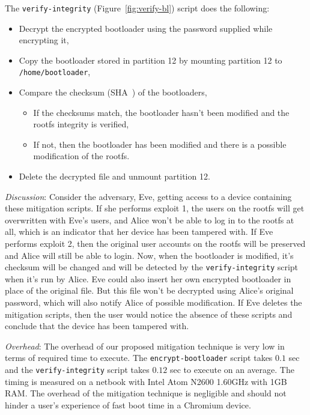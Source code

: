 \documentclass[11pt]{article}
\begin{document}
The \texttt{verify-integrity} (Figure~\ref{fig:verify-bl}) script does the following: 
\begin{itemize}
\item Decrypt the encrypted bootloader using the password supplied while
encrypting it,
\item Copy the bootloader stored in partition 12 by mounting partition 12
to \texttt{/home/bootloader},
\item Compare the checksum (SHA~\cite{sha1}) of the bootloaders,
\begin{itemize}
\item If the checksums match, the bootloader hasn't been modified and 
the rootfs integrity is verified,
\item If not, then the bootloader has been modified and there is a possible modification of the rootfs.
\end{itemize}

\item Delete the decrypted file and unmount partition 12.
\end{itemize}


\textit{Discussion}: Consider the adversary, Eve, getting access to a device containing these
mitigation scripts. If she performs exploit 1, the users on the rootfs will get
overwritten with Eve's users, and Alice won't be able to log in to the rootfs at all, which is an
indicator that her device has been tampered with. If Eve performs exploit 2, then the original user accounts on the rootfs will be preserved and Alice will still be able to login. Now, when the bootloader is modified, it's checksum will be changed and will be detected
by the \texttt{verify-integrity} script when it's run by Alice. Eve could also insert her own encrypted bootloader in
place of the original file. But this file won't be decrypted using Alice's original password, which will also notify Alice of possible modification.
If Eve deletes the mitigation scripts, then the user would notice the absence of these scripts and conclude that the device
has been tampered with.

\textit{Overhead}: The overhead of our proposed mitigation technique is very low in terms of required time to execute. The \texttt{encrypt-bootloader} script takes $0.1$ sec and the \texttt{verify-integrity} script takes $0.12$ sec to execute on an average. The timing is measured on a netbook with Intel Atom N2600 1.60GHz with 1GB RAM. The overhead of the mitigation technique is negligible and should not hinder a user's experience of fast boot time in a Chromium device.
\end{document}
